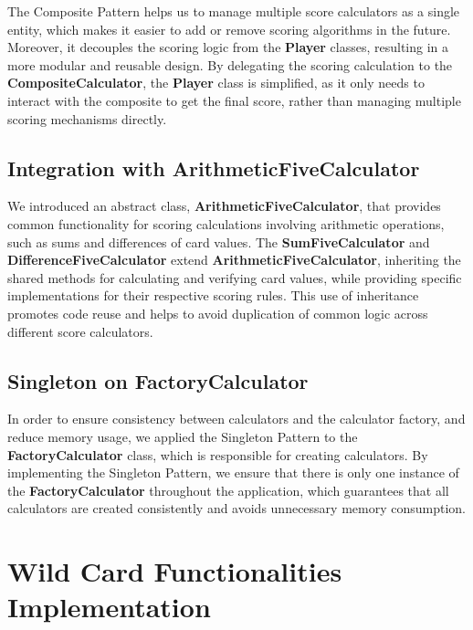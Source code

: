 \documentclass[a4paper, 12pt]{report}
\begin{document}
    The Composite Pattern helps us to manage multiple score calculators as a single entity, which makes it easier to add or remove scoring algorithms in the future. Moreover, it decouples the scoring logic from the \textbf{Player} classes, resulting in a more modular and reusable design. By delegating the scoring calculation to the \textbf{CompositeCalculator}, the \textbf{Player} class is simplified, as it only needs to interact with the composite to get the final score, rather than managing multiple scoring mechanisms directly.
    
    \subsection{Integration with ArithmeticFiveCalculator}
    We introduced an abstract class, \textbf{ArithmeticFiveCalculator}, that provides common functionality for scoring calculations involving arithmetic operations, such as sums and differences of card values. The \textbf{SumFiveCalculator} and \textbf{DifferenceFiveCalculator} extend \textbf{ArithmeticFiveCalculator}, inheriting the shared methods for calculating and verifying card values, while providing specific implementations for their respective scoring rules. This use of inheritance promotes code reuse and helps to avoid duplication of common logic across different score calculators.

    \subsection{Singleton on FactoryCalculator}
    In order to ensure consistency between calculators and the calculator factory, and reduce memory usage, we applied the Singleton Pattern to the \textbf{FactoryCalculator} class, which is responsible for creating calculators. By implementing the Singleton Pattern, we ensure that there is only one instance of the \textbf{FactoryCalculator} throughout the application, which guarantees that all calculators are created consistently and avoids unnecessary memory consumption.

    \newpage

    \section{Wild Card Functionalities Implementation}    
\end{document}
